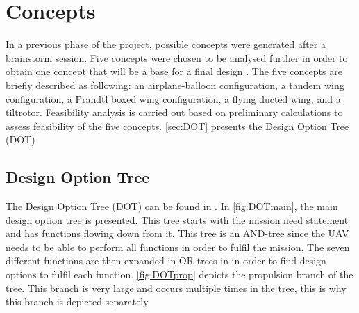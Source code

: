 \chapter{Concepts}
\label{ch:concepts}

In a previous phase of the project, possible concepts were generated after a brainstorm session. Five concepts were chosen to be analysed further in order to obtain one concept that will be a base for a final design \cite{baseline}. The five concepts are briefly described as following:  an airplane-balloon configuration, a tandem wing configuration, a Prandtl boxed wing configuration, a flying ducted wing, and a tiltrotor. Feasibility analysis is carried out based on preliminary calculations to assess feasibility of the five concepts. \autoref{sec:DOT} presents the Design Option Tree (DOT) 


\section{Design Option Tree}
\label{sec:DOT}

The Design Option Tree (DOT) can be found in . In \autoref{fig:DOTmain}, the main design option tree is presented. This tree starts with the mission need statement and has functions flowing down from it. This tree is an AND-tree since the UAV needs to be able to perform all functions in order to fulfil the mission. The seven different functions are then expanded in OR-trees in  in order to find design options to fulfil each function. \autoref{fig:DOTprop} depicts the propulsion branch of the tree. This branch is very large and occurs multiple times in the tree, this is why this branch is depicted separately.


